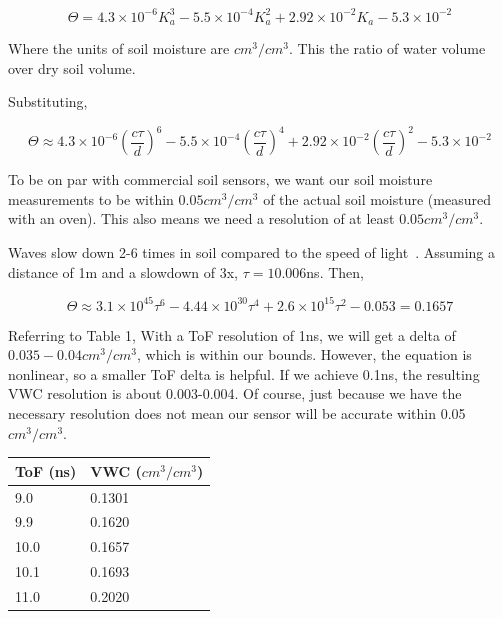\documentclass[12pt]{article}
\begin{document}
\begin{equation}
  \Theta = 4.3\times 10^{-6}K_a^3-5.5\times10^{-4}K_a^2+2.92\times 10^{-2}K_a-5.3\times 10^{-2}
\end{equation}

Where the units of soil moisture are $cm^3/cm^3$. This the ratio of water volume over dry soil volume.

Substituting,

\begin{equation}
  \Theta \approx 4.3\times 10^{-6} (\frac{c\tau}{d})^6-5.5\times10^{-4} (\frac{c\tau}{d})^4+2.92\times 10^{-2} (\frac{c\tau}{d})^2-5.3\times 10^{-2}
\end{equation}

To be on par with commercial soil sensors, we want our soil moisture
measurements to be within $0.05 cm^3/cm^3$ of the actual soil moisture
(measured with an oven). This also means we need a resolution of at
least $0.05 cm^3/cm^3$.

Waves slow down 2-6 times in soil compared to the speed of
light~\cite{gpr}. Assuming a distance of 1m and a slowdown of 3x,
$\tau = 10.006$ns. Then,

\begin{equation}
  \Theta \approx 3.1\times 10^{45}\tau^6-4.44\times 10^{30}\tau^4+2.6\times 10^{15}\tau^2-0.053 = 0.1657
\end{equation}

Referring to Table 1, With a ToF resolution of 1ns, we will get a
delta of $0.035-0.04 cm^3/cm^3$, which is within our bounds. However,
the equation is nonlinear, so a smaller ToF delta is helpful. If we
achieve 0.1ns, the resulting VWC resolution is about 0.003-0.004. Of
course, just because we have the necessary resolution does not mean
our sensor will be accurate within 0.05$cm^3/cm^3$.


\begin{table}[]
  \centering
\begin{tabular}{l|l}
\textbf{ToF (ns)} & \textbf{VWC ($cm^3/cm^3$)} \\ \hline
9.0               & 0.1301                                                      \\
9.9              & 0.1620                                                       \\
  10.0              & 0.1657                                                       \\
10.1              & 0.1693                                                       \\
11.0              & 0.2020                                                      
\end{tabular}
\end{table}
\end{document}
